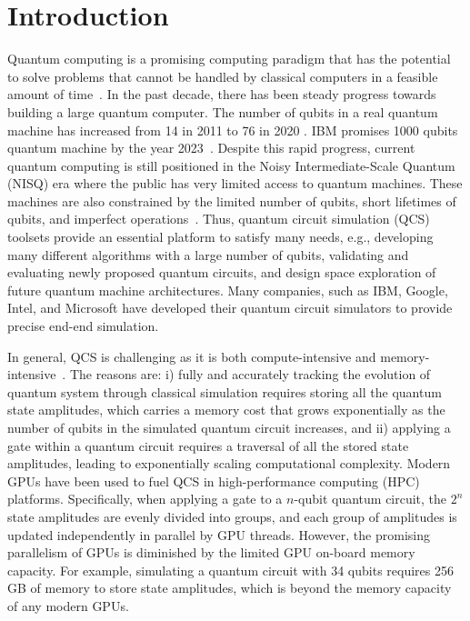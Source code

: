 \section{Introduction}
\label{sec:intro}
Quantum computing is a promising computing paradigm that has the potential to solve problems that cannot be handled by classical computers in a feasible amount of time~\cite{10.1038/s41567-018-0124-x}. In the past decade, there has been steady progress towards building a large quantum computer. The number of qubits in a real quantum machine has increased from 14 in 2011 \cite{10.1103/PhysRevLett.106.130506} to 76 in 2020 \cite{10.1126/science.abe8770}. 
IBM promises 1000 qubits quantum machine by the year 2023~\cite{IBM2023}. 
Despite this rapid progress, current quantum computing is still positioned in the Noisy Intermediate-Scale Quantum (NISQ) era where the public has very limited access to quantum machines. 
These machines are also constrained by the limited number of qubits, short lifetimes of qubits, and imperfect operations~\cite{10.22331/q-2018-08-06-79}. 
Thus, quantum circuit simulation (QCS) toolsets provide an essential platform to satisfy many needs, e.g., developing many different algorithms with a large number of qubits, validating and evaluating newly proposed quantum circuits, and design space exploration of future quantum machine architectures. 
Many companies, such as IBM, Google, Intel, and Microsoft have developed their quantum circuit simulators to provide precise end-end simulation.  


In general, QCS is challenging as it is both compute-intensive and memory-intensive~\cite{10.1109/HPCA51647.2021.00026,10.1109/DAC18072.2020.9218591}. 
The reasons are: i) fully and accurately tracking the evolution of quantum system through classical simulation \cite{10.1007/978-3-031-01765-0} requires storing all the quantum state amplitudes, which carries a memory cost that grows exponentially as the number of qubits in the simulated quantum circuit increases, and ii) applying a gate within a quantum circuit requires a traversal of all the stored state amplitudes,  leading to exponentially scaling computational complexity.  
Modern GPUs have been used to fuel QCS in high-performance computing (HPC) platforms. Specifically, when applying a gate to a $n$-qubit quantum circuit, the $2^n$ state amplitudes are evenly divided into groups, and each group of amplitudes is updated independently in parallel by GPU threads. 
However, the promising parallelism of GPUs is diminished by the limited GPU on-board memory capacity. For example, simulating a quantum circuit with 34 qubits requires 256 GB of memory to store state amplitudes, which is beyond the memory capacity of any modern GPUs. 

